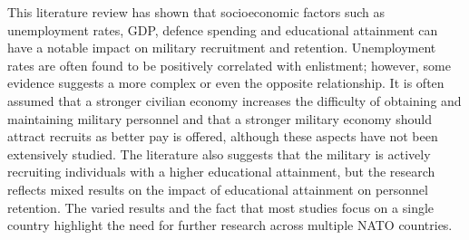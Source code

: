 This literature review has shown that socioeconomic factors such as unemployment rates, 
GDP, defence spending and educational attainment can have a notable impact on military 
recruitment and retention. Unemployment rates are often found to be positively correlated 
with enlistment; however, some evidence suggests a more complex or even the opposite 
relationship. It is often assumed that a stronger civilian economy increases the 
difficulty of obtaining and maintaining military personnel and that a stronger military 
economy should attract recruits as better pay is offered, although these aspects have 
not been extensively studied. The literature also suggests that the military is 
actively recruiting individuals with a higher educational attainment, but the research 
reflects mixed results on the impact of educational attainment on personnel retention. 
The varied results and the fact that most studies focus on a single country highlight 
the need for further research across multiple NATO countries.
